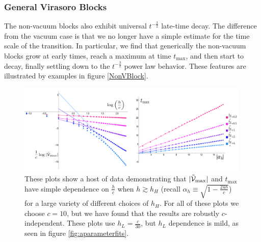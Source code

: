 \subsubsection{General Virasoro Blocks}

The non-vacuum blocks also exhibit universal $t^{-\frac{3}{2}}$ late-time decay. The difference from the vacuum case is that we no longer have a simple estimate for the time scale of the transition. In particular, we find that generically the non-vacuum blocks grow at early times, reach a maximum at time $t_{\max}$, and then start to  decay, finally settling down to the $t^{-\frac{3}{2}}$ power law behavior. These features are illustrated by examples in figure \ref{NonVBlock}. 

\begin{figure}[h]
\begin{centering}
\includegraphics[width=0.99\textwidth]{virasoro_chapter/LotsofDataforMaxandTime}
\caption{These plots show a host of data demonstrating that $|\tilde {{\cal V}}_{\max}|$ and $t_{\max}$ have simple dependence on $\frac{h}{c}$ when $h \gtrsim h_H$ (recall $\alpha_h \equiv \sqrt{1 - \frac{24h}{c}}$) for a large variety of different choices of $h_H$.  For all of these plots we choose $c=10$, but we have found that the results are robustly $c$-independent.  These plots use $h_L = \frac{c}{30}$, but $h_L$ dependence is mild, as seen in figure \ref{fig:aparameterfits}.  }
\label{fig:LotsofDataforMaxandTime}
\end{centering}
\end{figure}

